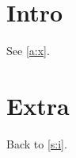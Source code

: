 \documentclass{article}
\begin{document}
\section{Intro}\label{s:i} See \autoref{a:x}.
\appendix
\section{Extra}\label{a:x} Back to \autoref{s:i}.
\end{document}
